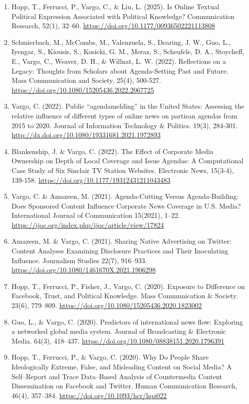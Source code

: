 \documentclass[11pt,letterpaper]{article}
\begin{document}
{\begin{enumerate}
\item Hopp, T., Ferrucci, P., Vargo, C., \& Liu, L. (2025). Is Online Textual Political Expression Associated with Political Knowledge? Communication Research, 52(1), 32--60. \url{https://doi.org/10.1177/00936502221113808}
\item Schmierbach, M., McCombs, M., Valenzuela, S., Dearing, J. W., Guo, L., Iyengar, S., Kiousis, S., Kosicki, G. M., Meraz, S., Scheufele, D. A., Stoycheff, E., Vargo, C., Weaver, D. H., \& Willnat, L. W. (2022). Reflections on a Legacy: Thoughts from Scholars about Agenda-Setting Past and Future. Mass Communication and Society, 25(4), 500-527. \url{https://doi.org/10.1080/15205436.2022.2067725}
\item Vargo, C. (2022). Public ``agendamelding'' in the United States: Assessing the relative influence of different types of online news on partisan agendas from 2015 to 2020. Journal of Information Technology \& Politics. 19(3), 284-301. \url{http://dx.doi.org/10.1080/19331681.2021.1972893}
\item Blankenship, J. \& Vargo, C. (2022). The Effect of Corporate Media Ownership on Depth of Local Coverage and Issue Agendas: A Computational Case Study of Six Sinclair TV Station Websites. Electronic News, 15(3-4), 139-158. \url{https://doi.org/10.1177/19312431211043483}
\item Vargo, C. \& Amazeen, M. (2021). Agenda-Cutting Versus Agenda-Building: Does Sponsored Content Influence Corporate News Coverage in U.S. Media? International Journal of Communication 15(2021), 1--22. \url{https://ijoc.org/index.php/ijoc/article/view/17824}
\item Amazeen, M. \& Vargo, C. (2021). Sharing Native Advertising on Twitter: Content Analyses Examining Disclosure Practices and Their Inoculating Influence. Journalism Studies 22(7), 916--933. \url{https://doi.org/10.1080/1461670X.2021.1906298}
\item Hopp, T., Ferrucci, P., Fisher, J., Vargo, C. (2020). Exposure to Difference on Facebook, Trust, and Political Knowledge. Mass Communication \& Society. 23(6), 779--809. \url{https://doi.org/10.1080/15205436.2020.1823002}
\item Guo, L., \& Vargo, C. (2020). Predictors of international news flow: Exploring a networked global media system. Journal of Broadcasting \& Electronic Media. 64(3), 418--437. \url{https://doi.org/10.1080/08838151.2020.1796391}
\item Hopp, T., Ferrucci, P., \& Vargo, C. (2020). Why Do People Share Ideologically Extreme, False, and Misleading Content on Social Media? A Self--Report and Trace Data--Based Analysis of Countermedia Content Dissemination on Facebook and Twitter. Human Communication Research, 46(4), 357--384. \url{https://doi.org/10.1093/hcr/hqz022}

\end{enumerate}}
\end{document}
